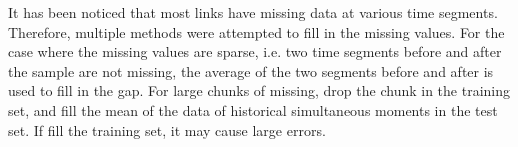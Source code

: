 It has been noticed that most links have missing data at various time segments.
Therefore, multiple methods were attempted to fill in the missing values. For the case where the missing values are sparse, i.e. two 
time segments before and after the sample are not missing, 
the average of the two segments before and after is used to fill in the gap. 
For large chunks of missing, drop the chunk in the training set, and fill the mean of the data of historical simultaneous moments in the test set. If fill the training set, it may cause large errors.
